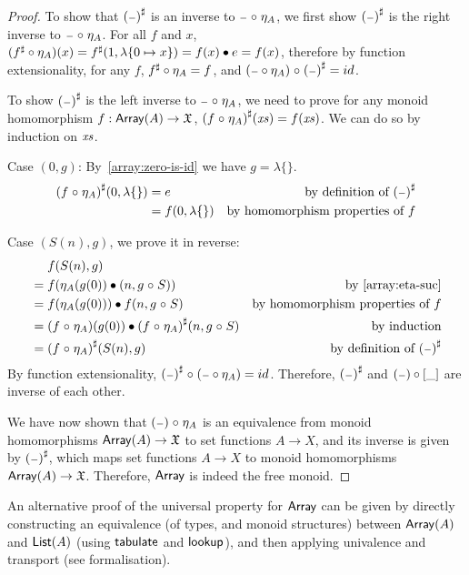 \begin{proof}
    To show that $\ext{(\blank)}$ is an inverse to $\blank \comp \eta_A$,
    we first show $\ext{(\blank)}$ is the right inverse to $\blank \comp \eta_A$.
    For all $f$ and $x$, $({f}^{\sharp} \circ \eta_A)(x) = {f}^{\sharp}(1, \lambda\{0 \mapsto x\}) = f(x) \mathbin{\bullet} e = f(x)$,
    therefore by function extensionality, for any $f$, ${f}^{\sharp} \circ \eta_A = f$,
    and $(\blank \circ \eta_A) \comp \ext{(\blank)} = id$.

    To show $\ext{(\blank)}$ is the left inverse to $\blank \comp \eta_A$, we need to prove
    for any monoid homomorphism $f : \operatorname{\mathsf{Array}}(A) \to \mathfrak{X}$, ${(f \mathrel{\circ} \eta_A)}^{\sharp}(\mathit{xs}) = f(\mathit{xs})$.
    We can do so by induction on $\mathit{xs}$.

    Case $(0, g)$:
    By~\cref{array:zero-is-id} we have $g = \lambda\{\}$.
    \begin{align*}
        \ext{(f \comp \eta_A)}(0, \lambda\{\})
         & = e                 & \text{by definition of $\ext{(\blank)}$} \\
         & = f(0, \lambda\{\}) & \text{by homomorphism properties of $f$}
    \end{align*}

    Case $(S(n), g)$, we prove it in reverse:
    \begin{align*}
         & \mathrel{\phantom{=}} f(S(n), g)                                                                               \\
         & = f(\eta_A(g(0)) \mult (n, g \comp S))                              & \text{by~\cref{array:eta-suc}}           \\
         & = f(\eta_A(g(0))) \mult f(n, g \comp S)                             & \text{by homomorphism properties of $f$} \\
         & = (f \comp \eta_A)(g(0)) \mult \ext{(f \comp \eta_A)}(n, g \comp S) & \text{by induction}                      \\
         & = \ext{(f \comp \eta_A)}(S(n), g)                                   & \text{by definition of $\ext{(\blank)}$}
    \end{align*}
    By function extensionality, $\ext{(\blank)} \comp (\blank \circ \eta_A) = id$.
    Therefore, $\ext{(\blank)}$ and $(\blank) \circ [\_]$ are inverse of each other.

    We have now shown that $(\blank) \comp \eta_A$ is an equivalence from
    monoid homomorphisms $\operatorname{\mathsf{Array}}(A) \to \mathfrak{X}$
    to set functions $A \to X$, and its inverse is given by $\ext{(\blank)}$, which maps set
    functions $A \to X$ to monoid homomorphisms $\operatorname{\mathsf{Array}}(A) \to \mathfrak{X}$. Therefore, $\operatorname{\mathsf{Array}}$ is indeed
    the free monoid.
\end{proof}
%
An alternative proof of the universal property for $\operatorname{\mathsf{Array}}$ can be given by directly constructing an equivalence (of
types, and monoid structures) between $\operatorname{\mathsf{Array}}(A)$ and $\operatorname{\mathsf{List}}(A)$ (using $\operatorname{\mathsf{tabulate}}$ and $\operatorname{\mathsf{lookup}}$), and then
applying univalence and transport (see formalisation).
